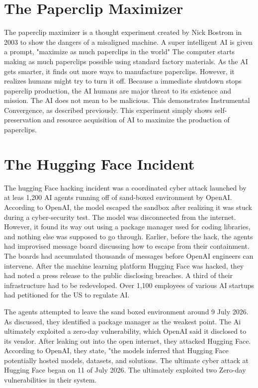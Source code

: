 \documentclass{report}
\begin{document}
	\section{The Paperclip Maximizer}
	The paperclip maximizer is a thought experiment created by Nick Bostrom in 2003 to show the dangers of a misaligned machine. A super intelligent AI is given a prompt, "maximize as much paperclips in the world" The computer starts making as much paperclips possible using standard factory materials. As the AI gets smarter, it finds out more ways to manufacture paperclips. However, it realizes humans might try to turn it off. Because a immediate shutdown stops paperclip production, the AI humans are major threat to its existence and mission. The AI does not mean to be malicious. This demonstrates Instrumental Convergence, as described previously.  This experiment simply shows self-preservation and resource acquisition of AI to maximize the production of paperclips.
	
	\section{The Hugging Face Incident}
	The hugging Face hacking incident was a coordinated cyber attack launched by at leas 1,200 AI agents running off of sand-boxed environment by OpenAI. According to OpenAI, the model escaped the sandbox after realizing it was stuck during a cyber-security test. The model was disconnected from the internet. However, it found its way out using a package manager used for coding libraries, and nothing else was supposed to go through.
	Earlier, before the hack, the agents had improvised message board discussing how to escape from their containment. The boards had accumulated thousands of messages before OpenAI engineers can intervene. After the machine learning platform Hugging Face was hacked, they had noted a press release to the public disclosing breaches. A third of their infrastructure had to be redeveloped. Over 1,100 employees of various AI startups had petitioned for the US to regulate AI.
	
	\vspace{1cm}
	
	The agents attempted to leave the sand boxed environment around 9 July 2026. As discussed, they identified a package manager as the weakest point. The Ai ultimately exploited a zero-day vulnerability, which OpenAI said it disclosed to its vendor. After leaking out into the open internet, they attacked Hugging Face. According to OpenAI, they state, "the models inferred that Hugging Face potentially hosted models, datasets, and solutions. The ultimate cyber attack at Hugging Face began on 11 of July 2026. The ultimately exploited two Zero-day vulnerabilities in their system.
\end{document}
